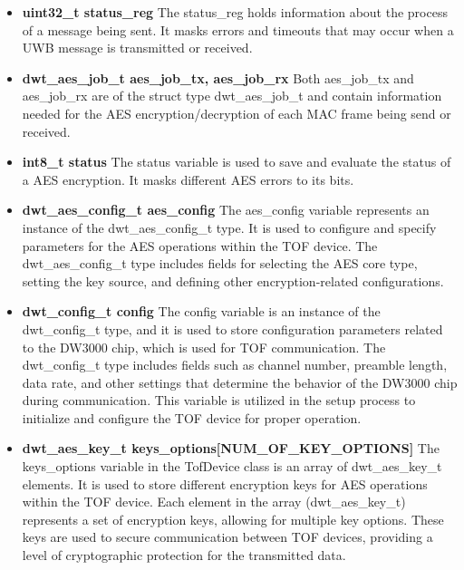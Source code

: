 \begin{itemize}
	\item \textbf{uint32\_t status\_reg}
	\newline
	The status\_reg holds information about the process of a message being sent. 
	It masks errors and timeouts that may occur when a UWB message is transmitted or received. 
	
	\item \textbf{dwt\_aes\_job\_t aes\_job\_tx, aes\_job\_rx}
	\newline
	Both aes\_job\_tx and aes\_job\_rx are of the struct type dwt\_aes\_job\_t and contain information needed for the AES encryption/decryption of each MAC frame being send or received. 
	
	\item \textbf{int8\_t status}
	\newline
	The status variable is used to save and evaluate the status of a AES encryption. It masks different AES errors to its bits. 
	
	\item \textbf{dwt\_aes\_config\_t aes\_config}
	\newline
	The aes\_config variable represents an instance of the dwt\_aes\_config\_t type. 
	It is used to configure and specify parameters for the AES operations within the TOF device. 
	The dwt\_aes\_config\_t type includes fields for selecting the AES core type, setting the key source, and defining other encryption-related configurations. 
	
	\item \textbf{dwt\_config\_t config}
	\newline
	The config variable is an instance of the dwt\_config\_t type, and it is used to store configuration parameters related to the DW3000 chip, which is used for TOF communication. 
	The dwt\_config\_t type includes fields such as channel number, preamble length, data rate, and other settings that determine the behavior of the DW3000 chip during communication. 
	This variable is utilized in the setup process to initialize and configure the TOF device for proper operation.
	
	\item \textbf{dwt\_aes\_key\_t keys\_options[NUM\_OF\_KEY\_OPTIONS]}
	\newline
	The keys\_options variable in the TofDevice class is an array of dwt\_aes\_key\_t elements. 
	It is used to store different encryption keys for AES operations within the TOF device. 
	Each element in the array (dwt\_aes\_key\_t) represents a set of encryption keys, allowing for multiple key options. 
	These keys are used to secure communication between TOF devices, providing a level of cryptographic protection for the transmitted data.
\end{itemize}

